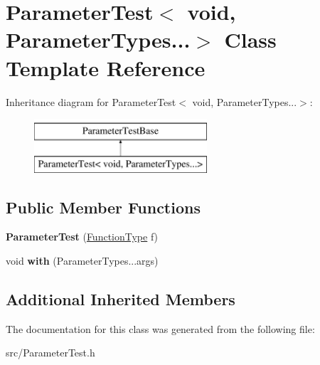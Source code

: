 \hypertarget{class_parameter_test_3_01void_00_01_parameter_types_8_8_8_4}{\section{Parameter\-Test$<$ void, Parameter\-Types...$>$ Class Template Reference}
\label{class_parameter_test_3_01void_00_01_parameter_types_8_8_8_4}
}
Inheritance diagram for Parameter\-Test$<$ void, Parameter\-Types...$>$\-:\begin{figure}[H]
\begin{center}
\leavevmode
\includegraphics[height=2.000000cm]{class_parameter_test_3_01void_00_01_parameter_types_8_8_8_4}
\end{center}
\end{figure}
\subsection*{Public Member Functions}
\begin{DoxyCompactItemize}
\item 
\hypertarget{class_parameter_test_3_01void_00_01_parameter_types_8_8_8_4_aea9c66b5df4e8cfc14202e9016c31427}{{\bfseries Parameter\-Test} (\hyperlink{struct_function_type}{Function\-Type} f)}\label{class_parameter_test_3_01void_00_01_parameter_types_8_8_8_4_aea9c66b5df4e8cfc14202e9016c31427}

\item 
\hypertarget{class_parameter_test_3_01void_00_01_parameter_types_8_8_8_4_a7642c56472ea823529c370e2e5c31028}{void {\bfseries with} (Parameter\-Types...\-args)}\label{class_parameter_test_3_01void_00_01_parameter_types_8_8_8_4_a7642c56472ea823529c370e2e5c31028}

\end{DoxyCompactItemize}
\subsection*{Additional Inherited Members}


The documentation for this class was generated from the following file\-:\begin{DoxyCompactItemize}
\item 
src/Parameter\-Test.\-h\end{DoxyCompactItemize}
